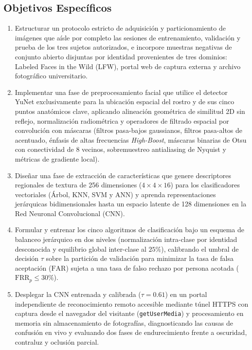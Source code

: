 \documentclass{article}
\begin{document}
\subsection{Objetivos Específicos}
\begin{enumerate}
    \item Estructurar un protocolo estricto de adquisición y particionamiento de imágenes que aísle por completo las sesiones de entrenamiento, validación y prueba de los tres sujetos autorizados, e incorpore muestras negativas de conjunto abierto disjuntas por identidad provenientes de tres dominios: Labeled Faces in the Wild (LFW), portal web de captura externa y archivo fotográfico universitario.
    \item Implementar una fase de preprocesamiento facial que utilice el detector YuNet exclusivamente para la ubicación espacial del rostro y de sus cinco puntos anatómicos clave, aplicando alineación geométrica de similitud 2D sin reflejo, normalización radiométrica y operadores de filtrado espacial por convolución con máscaras (filtros pasa-bajos gaussianos, filtros pasa-altos de acentuado, énfasis de altas frecuencias \textit{High-Boost}, máscaras binarias de Otsu con conectividad de 8 vecinos, sobremuestreo antialiasing de Nyquist y métricas de gradiente local).
    \item Diseñar una fase de extracción de características que genere descriptores regionales de textura de 256 dimensiones ($4 \times 4 \times 16$) para los clasificadores vectoriales (Árbol, KNN, SVM y ANN) y aprenda representaciones jerárquicas bidimensionales hasta un espacio latente de 128 dimensiones en la Red Neuronal Convolucional (CNN).
    \item Formular y entrenar los cinco algoritmos de clasificación bajo un esquema de balanceo jerárquico en dos niveles (normalización intra-clase por identidad desconocida y equilibrio global inter-clase al $25\%$), calibrando el umbral de decisión $\tau$ sobre la partición de validación para minimizar la tasa de falsa aceptación ($\text{FAR}$) sujeta a una tasa de falso rechazo por persona acotada ($\text{FRR}_p \le 30\%$).
    \item Desplegar la CNN entrenada y calibrada ($\tau = 0.61$) en un portal independiente de reconocimiento remoto accesible mediante túnel HTTPS con captura desde el navegador del visitante (\texttt{getUserMedia}) y procesamiento en memoria sin almacenamiento de fotografías, diagnosticando las causas de confusión en vivo y evaluando dos fases de endurecimiento frente a oscuridad, contraluz y oclusión parcial.
\end{enumerate}
\end{document}
